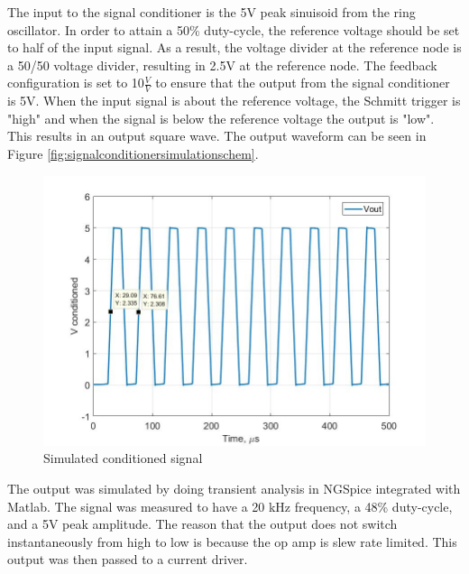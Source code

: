 The input to the signal conditioner is the 5V peak sinuisoid from the ring oscillator. In order to attain a 50\% duty-cycle, the reference voltage should be set to half of the input signal. As a result, the voltage divider at the reference node is a 50/50 voltage divider, resulting in 2.5V at the reference node. The feedback configuration is set to 10$\frac{V}{V}$ to ensure that the output from the signal conditioner is 5V. When the input signal is about the reference voltage, the Schmitt trigger is "high" and when the signal is below the reference voltage the output is "low". This results in an output square wave. The output waveform can be seen in Figure \ref{fig:signalconditionersimulationschem}.

\begin{figure}[H]
	\centering
	\includegraphics[width=0.6\linewidth]{CircuitDevelopment/Vconditioned_sim}
	\caption[Simulated conditioned signal]{Simulated conditioned signal}
	\label{fig:vconditionedsim}
\end{figure}

The output was simulated by doing transient analysis in NGSpice integrated with Matlab. The signal was measured to have a 20 kHz frequency, a 48\% duty-cycle, and a 5V peak amplitude. The reason that the output does not switch instantaneously from high to low is because the op amp is slew rate limited. This output was then passed to a current driver.


